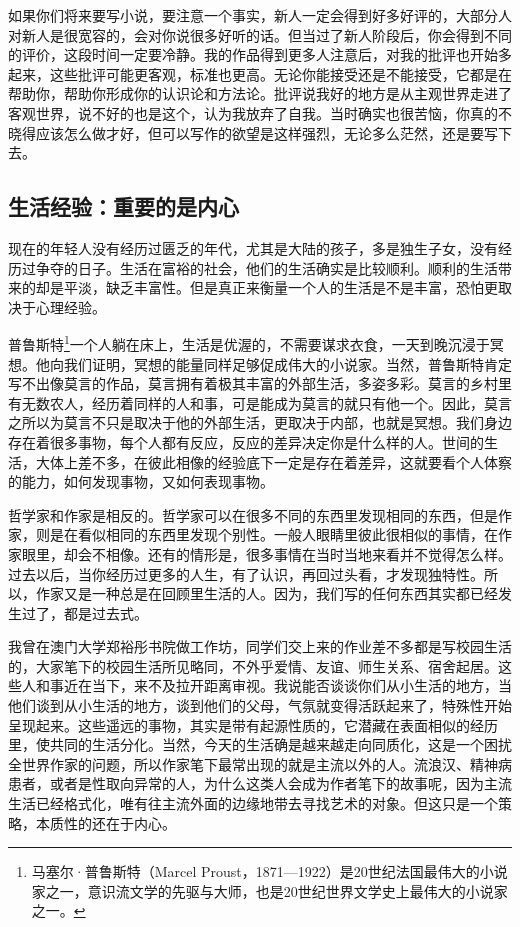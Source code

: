 \documentclass[fontset=fandol,12pt,a5paper]{ctexbook}
\begin{document}
如果你们将来要写小说，要注意一个事实，新人一定会得到好多好评的，大部分人对新人是很宽容的，会对你说很多好听的话。但当过了新人阶段后，你会得到不同的评价，这段时间一定要冷静。我的作品得到更多人注意后，对我的批评也开始多起来，这些批评可能更客观，标准也更高。无论你能接受还是不能接受，它都是在帮助你，帮助你形成你的认识论和方法论。批评说我好的地方是从主观世界走进了客观世界，说不好的也是这个，认为我放弃了自我。当时确实也很苦恼，你真的不晓得应该怎么做才好，但可以写作的欲望是这样强烈，无论多么茫然，还是要写下去。

\subsection{生活经验：重要的是内心}
现在的年轻人没有经历过匮乏的年代，尤其是大陆的孩子，多是独生子女，没有经历过争夺的日子。生活在富裕的社会，他们的生活确实是比较顺利。顺利的生活带来的却是平淡，缺乏丰富性。但是真正来衡量一个人的生活是不是丰富，恐怕更取决于心理经验。

普鲁斯特\footnote{马塞尔·普鲁斯特（Marcel Proust，1871—1922）是20世纪法国最伟大的小说家之一，意识流文学的先驱与大师，也是20世纪世界文学史上最伟大的小说家之一。}一个人躺在床上，生活是优渥的，不需要谋求衣食，一天到晚沉浸于冥想。他向我们证明，冥想的能量同样足够促成伟大的小说家。当然，普鲁斯特肯定写不出像莫言的作品，莫言拥有着极其丰富的外部生活，多姿多彩。莫言的乡村里有无数农人，经历着同样的人和事，可是能成为莫言的就只有他一个。因此，莫言之所以为莫言不只是取决于他的外部生活，更取决于内部，也就是冥想。我们身边存在着很多事物，每个人都有反应，反应的差异决定你是什么样的人。世间的生活，大体上差不多，在彼此相像的经验底下一定是存在着差异，这就要看个人体察的能力，如何发现事物，又如何表现事物。

哲学家和作家是相反的。哲学家可以在很多不同的东西里发现相同的东西，但是作家，则是在看似相同的东西里发现个别性。一般人眼睛里彼此很相似的事情，在作家眼里，却会不相像。还有的情形是，很多事情在当时当地来看并不觉得怎么样。过去以后，当你经历过更多的人生，有了认识，再回过头看，才发现独特性。所以，作家又是一种总是在回顾里生活的人。因为，我们写的任何东西其实都已经发生过了，都是过去式。

我曾在澳门大学郑裕彤书院做工作坊，同学们交上来的作业差不多都是写校园生活的，大家笔下的校园生活所见略同，不外乎爱情、友谊、师生关系、宿舍起居。这些人和事近在当下，来不及拉开距离审视。我说能否谈谈你们从小生活的地方，当他们谈到从小生活的地方，谈到他们的父母，气氛就变得活跃起来了，特殊性开始呈现起来。这些遥远的事物，其实是带有起源性质的，它潜藏在表面相似的经历里，使共同的生活分化。当然，今天的生活确是越来越走向同质化，这是一个困扰全世界作家的问题，所以作家笔下最常出现的就是主流以外的人。流浪汉、精神病患者，或者是性取向异常的人，为什么这类人会成为作者笔下的故事呢，因为主流生活已经格式化，唯有往主流外面的边缘地带去寻找艺术的对象。但这只是一个策略，本质性的还在于内心。
\end{document}
